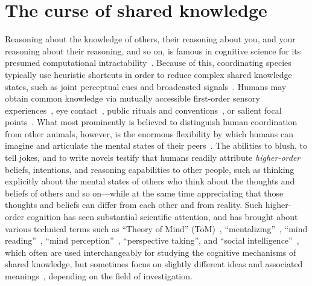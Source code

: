 \documentclass[twocolumn,a4paper,superscriptaddress,nofootinbib]{revtex4}
\begin{document}
\section{The curse of shared knowledge}
Reasoning about the knowledge of others, their reasoning about you, and your reasoning about their reasoning, and so on, is famous in cognitive science for its presumed computational intractability~\citep{van2018parameterized}. Because of this, coordinating species typically use heuristic shortcuts in order to reduce complex shared knowledge states, such as joint perceptual cues and broadcasted signals~\citep{milgrom1981axiomatic, clark1996using, bradbury1998principles}. Humans may obtain common knowledge via mutually accessible first-order sensory experiences~\citep{tomasello1995joint, lorini2005establishing, bolander2015announcements, gintis2010rationality}, eye contact~\citep{friedell1969structure}, public rituals and conventions~\citep{lewis1969convention}, or salient focal points~\citep{schelling1957bargaining}. What most prominently is believed to distinguish human coordination from other animals, however, is the enormous flexibility by which humans can imagine and articulate the mental states of their peers~\citep{tooby2010groups, harari2014sapiens}. The abilities to blush, to tell jokes, and to write novels testify that humans readily attribute \textit{higher-order} beliefs, intentions, and reasoning capabilities to other people, such as thinking explicitly about the mental states of others who think about the thoughts and beliefs of others and so on---while at the same time appreciating that those thoughts and beliefs can differ from each other and from reality. Such higher-order cognition has seen substantial scientific attention, and has brought about various technical terms such as ``Theory of Mind'' (ToM)~\citep{premack1978does}, ``mentalizing''~\citep{frith2003development}, ``mind reading''~\citep{vogeley2001mind, apperly2010mindreaders}, %
``mind perception''~\citep{gray2011distortions}, ``perspective taking'', and ``social intelligence''~\citep{baron1999social}, which often are used interchangeably for studying the cognitive mechanisms of shared knowledge, but sometimes focus on slightly different ideas and associated meanings~\citep{schaafsma2015deconstructing}, depending on the field of investigation.
\end{document}
